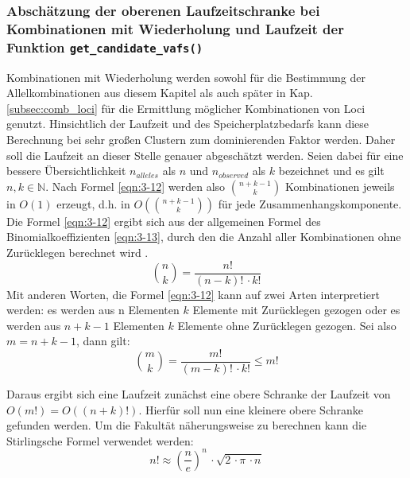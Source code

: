 \subsubsection{Abschätzung der oberenen Laufzeitschranke bei Kombinationen mit Wiederholung und Laufzeit der Funktion \lstinline|get_candidate_vafs()|} \label{subsubsec:cand_vafs}
Kombinationen mit Wiederholung werden sowohl für die Bestimmung der Allelkombinationen aus diesem Kapitel als auch später in Kap. \ref{subsec:comb_loci} für die Ermittlung möglicher Kombinationen von Loci genutzt. Hinsichtlich der Laufzeit und des Speicherplatzbedarfs kann diese Berechnung bei sehr großen Clustern zum dominierenden Faktor werden. Daher soll die Laufzeit an dieser Stelle genauer abgeschätzt werden. Seien dabei für eine bessere Übersichtlichkeit $ n_{alleles} $ als $ n $ und $ n_{observed} $ als $k$ bezeichnet und es gilt $n, k \in \mathds{N} $. Nach Formel \eqref{eqn:3-12} werden also $ \binom{n + k - 1}{k} $ Kombinationen jeweils in $O(1)$ erzeugt, d.h. in $ O(\binom{n + k - 1}{k}) $ für jede Zusammenhangskomponente. \\

Die Formel \eqref{eqn:3-12} ergibt sich aus der allgemeinen Formel des Binomialkoeffizienten \eqref{eqn:3-13}, durch den die Anzahl aller Kombinationen ohne Zurücklegen berechnet wird \cite{tb_stat}. 
\begin{equation} \label{eqn:3-13}
\tag{3-13}
\binom{n}{k} = \frac{n!}{(n-k)!\, \cdotp k!}
\end{equation} 
Mit anderen Worten, die Formel \eqref{eqn:3-12} kann auf zwei Arten interpretiert werden: es werden aus n Elementen $ k $ Elemente mit Zurücklegen gezogen oder es werden aus $ n + k - 1 $ Elementen $ k $ Elemente ohne Zurücklegen gezogen. Sei also  $ m = n + k - 1 $, dann gilt:
\begin{equation} \label{eqn:3-14}
\tag{3-14}
\binom{m}{k} = \frac{m!}{(m - k)!\, \cdotp k!} \leq m!
\end{equation} 

Daraus ergibt sich eine Laufzeit zunächst eine obere Schranke der Laufzeit von $ O(m!) = O((n + k)!) $. Hierfür soll nun eine kleinere obere Schranke gefunden werden. Um die Fakultät näherungsweise zu berechnen kann die Stirlingsche Formel \cite{bronst} verwendet werden:
\begin{equation} \label{eqn:3-15}
\tag{3-15}
n! \approx \left( \frac{n}{e} \right) ^n \, \cdotp \sqrt{2 \, \cdotp \pi \, \cdotp n}
\end{equation} 

